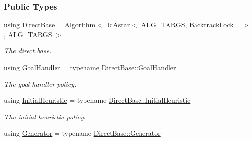 \subsubsection*{Public Types}
\begin{DoxyCompactItemize}
\item 
using \hyperlink{structslb_1_1ext_1_1algorithm_1_1IdAstar_a3b1c66ba098103b55a32545be40256e8}{Direct\+Base} = \hyperlink{structslb_1_1ext_1_1algorithm_1_1Algorithm}{Algorithm}$<$ \hyperlink{structslb_1_1ext_1_1algorithm_1_1IdAstar}{Id\+Astar}$<$ \hyperlink{algorithm_8h_a425b5a86fe8dae889a8343e14267c3c0}{A\+L\+G\+\_\+\+T\+A\+R\+GS}, Backtrack\+Lock\+\_\+ $>$, \hyperlink{algorithm_8h_a425b5a86fe8dae889a8343e14267c3c0}{A\+L\+G\+\_\+\+T\+A\+R\+GS} $>$\hypertarget{structslb_1_1ext_1_1algorithm_1_1IdAstar_a3b1c66ba098103b55a32545be40256e8}{}\label{structslb_1_1ext_1_1algorithm_1_1IdAstar_a3b1c66ba098103b55a32545be40256e8}

\begin{DoxyCompactList}\small\item\em The direct base. \end{DoxyCompactList}\item 
using \hyperlink{structslb_1_1ext_1_1algorithm_1_1IdAstar_a5a4300b273ca541f97e1ae86a1d09967}{Goal\+Handler} = typename \hyperlink{structslb_1_1ext_1_1algorithm_1_1Algorithm_ae0c6a75028107e4642e43798f21f4bfc}{Direct\+Base\+::\+Goal\+Handler}\hypertarget{structslb_1_1ext_1_1algorithm_1_1IdAstar_a5a4300b273ca541f97e1ae86a1d09967}{}\label{structslb_1_1ext_1_1algorithm_1_1IdAstar_a5a4300b273ca541f97e1ae86a1d09967}

\begin{DoxyCompactList}\small\item\em The goal handler policy. \end{DoxyCompactList}\item 
using \hyperlink{structslb_1_1ext_1_1algorithm_1_1IdAstar_a8fbd0ea83656e8d8d3bd56efccd57a43}{Initial\+Heuristic} = typename \hyperlink{structslb_1_1ext_1_1algorithm_1_1Algorithm_ad1f8f28e7b07f747ef7b7b5bf0643c2d}{Direct\+Base\+::\+Initial\+Heuristic}\hypertarget{structslb_1_1ext_1_1algorithm_1_1IdAstar_a8fbd0ea83656e8d8d3bd56efccd57a43}{}\label{structslb_1_1ext_1_1algorithm_1_1IdAstar_a8fbd0ea83656e8d8d3bd56efccd57a43}

\begin{DoxyCompactList}\small\item\em The initial heuristic policy. \end{DoxyCompactList}\item 
using \hyperlink{structslb_1_1ext_1_1algorithm_1_1IdAstar_a617d9f62e80522edaf3c25d2bf1af9ec}{Generator} = typename \hyperlink{structslb_1_1ext_1_1algorithm_1_1Algorithm_afa5a78c048b4fe4f5848aeaf5c1f8d65}{Direct\+Base\+::\+Generator}\hypertarget{structslb_1_1ext_1_1algorithm_1_1IdAstar_a617d9f62e80522edaf3c25d2bf1af9ec}{}\label{structslb_1_1ext_1_1algorithm_1_1IdAstar_a617d9f62e80522edaf3c25d2bf1af9ec}


\end{DoxyCompactItemize}
